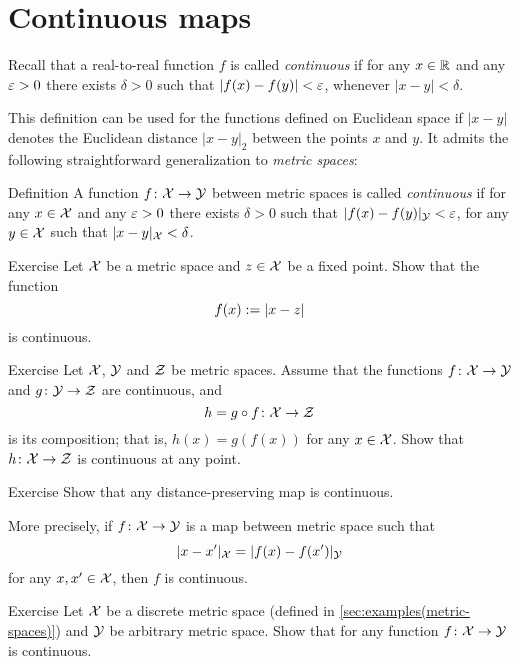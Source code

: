 \section{Continuous maps}

Recall that a real-to-real function $f$ is called \emph{continuous} 
if for any $x\in \mathbb{R}$ and any $\varepsilon > 0$ there exists $\delta > 0$ such that $|f(x)-f(y)|<\varepsilon$, whenever $|x-y|<\delta$. 

This definition can be used for the functions defined on Euclidean space if $|x-y|$ denotes the Euclidean distance $|x-y|_2$ between the points $x$ and $y$.
It admits the following straightforward generalization to \emph{metric spaces}:

\begin{thm}{Definition}\label{def:cont-epsilon-delta}
A function $f\colon\mathcal{X}\to\mathcal{Y}$ between metric spaces is called \emph{continuous} 
if for any  $x\in \mathcal{X}$ and any $\varepsilon>0$ there exists $\delta>0$ such that 
$|f(x)-f(y)|_{\mathcal{Y}}<\varepsilon$,
for any
$y\in \mathcal{X}$
such that
$|x-y|_{\mathcal{X}}<\delta$.
\end{thm}

\begin{thm}{Exercise}\label{ex:dist-cont}
Let $\mathcal{X}$ be a metric space and $z\in \mathcal{X}$ be a fixed point.
Show that the function 
$$f(x)\mathrel{:=}|x-z|$$ 
is continuous.
\end{thm}

\begin{thm}{Exercise}\label{ex:comp+cont}
Let $\mathcal{X}$, $\mathcal{Y}$ and $\mathcal{Z}$ be metric spaces.
Assume that the functions $f\colon\mathcal{X}\to\mathcal{Y}$
and $g\colon\mathcal{Y}\to\mathcal{Z}$ are continuous,
and 
\[h=g\circ f\colon\mathcal{X}\to \mathcal{Z}\] is its composition;
that is, $h(x)=g(f(x))$ for any $x\in \mathcal{X}$.
Show that $h\colon\mathcal{X}\to\mathcal{Z}$ is continuous at any point.
\end{thm}

\begin{thm}{Exercise}\label{ex:isom-cont}
Show that any distance-preserving map is continuous.

More precisely, if $f\colon\mathcal{X}\to\mathcal{Y}$ is a map between metric space such that
\[|x-x'|_{\mathcal X}=
|f(x)-f(x')|_{\mathcal Y}\]
for any $x,x'\in \mathcal{X}$, then 
$f$ is continuous.
\end{thm}

\begin{thm}{Exercise}\label{ex:to-descrete}
Let $\mathcal{X}$ be a discrete metric space (defined in \ref{sec:examples(metric-spaces)})
and $\mathcal{Y}$ be arbitrary metric space.
Show that for any function $f\colon\mathcal{X}\to\mathcal{Y}$ is continuous.
\end{thm}



